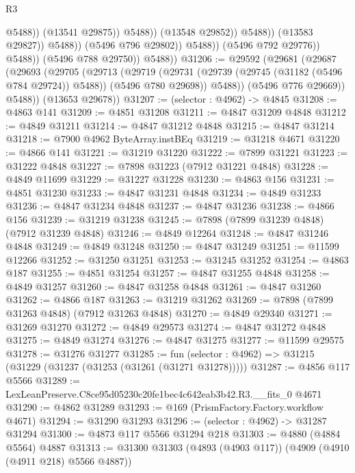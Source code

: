\begin{lexlean}{R3}
\begin{coremodule}
                                            @5488))
                                        (@13541 @29875))
                                      @5488))
                                  (@13548 @29852))
                                @5488))
                            (@13583 @29827))
                          @5488))
                      (@5496 @796 @29802))
                    @5488))
                (@5496 @792 @29776))
              @5488))
          (@5496 @788 @29750))
        @5488))
@31206 := @29592
    (@29681
      (@29687
        (@29693
          (@29705
            (@29713
              (@29719
                (@29731 (@29739 (@29745 (@31182 (@5496 @784 @29724)) @5488)) (@5496 @780 @29698))
                @5488))
            (@5496 @776 @29669))
          @5488))
      (@13653 @29678))
@31207 := (selector : @4962) -> @4845
@31208 := @4863 @141
@31209 := @4851 @31208
@31211 := @4847 @31209 @4848
@31212 := @4849 @31211
@31214 := @4847 @31212 @4848
@31215 := @4847 @31214
@31218 := @7900 @4962 ByteArray.instBEq
@31219 := @31218 @4671
@31220 := @4866 @141
@31221 := @31219 @31220
@31222 := @7899 @31221
@31223 := @31222 @4848
@31227 := @7898 @31223 (@7912 @31221 @4848)
@31228 := @4849 @11699
@31229 := @31227 @31228
@31230 := @4863 @156
@31231 := @4851 @31230
@31233 := @4847 @31231 @4848
@31234 := @4849 @31233
@31236 := @4847 @31234 @4848
@31237 := @4847 @31236
@31238 := @4866 @156
@31239 := @31219 @31238
@31245 := @7898 (@7899 @31239 @4848) (@7912 @31239 @4848)
@31246 := @4849 @12264
@31248 := @4847 @31246 @4848
@31249 := @4849 @31248
@31250 := @4847 @31249
@31251 := @11599 @12266
@31252 := @31250 @31251
@31253 := @31245 @31252
@31254 := @4863 @187
@31255 := @4851 @31254
@31257 := @4847 @31255 @4848
@31258 := @4849 @31257
@31260 := @4847 @31258 @4848
@31261 := @4847 @31260
@31262 := @4866 @187
@31263 := @31219 @31262
@31269 := @7898 (@7899 @31263 @4848) (@7912 @31263 @4848)
@31270 := @4849 @29340
@31271 := @31269 @31270
@31272 := @4849 @29573
@31274 := @4847 @31272 @4848
@31275 := @4849 @31274
@31276 := @4847 @31275
@31277 := @11599 @29575
@31278 := @31276 @31277
@31285 := fun (selector : @4962) => @31215 (@31229 (@31237 (@31253 (@31261 (@31271 @31278)))))
@31287 := @4856 @117 @5566
@31289 := LexLeanPreserve.C8ce95d05230c20fe1bec4c642eab3b42.R3.__fits_0 @4671
@31290 := @4862 @31289
@31293 := @169 (PrismFactory.Factory.workflow @4671)
@31294 := @31290 @31293
@31296 := (selector : @4962) -> @31287 @31294
@31300 := @4873 @117 @5566 @31294 @218
@31303 := @4880 (@4884 @5564) @4887
@31313 := @31300 @31303 (@4893 (@4903 @117)) (@4909 (@4910 (@4911 @218) @5566 @4887))

\end{coremodule}
\end{lexlean}
